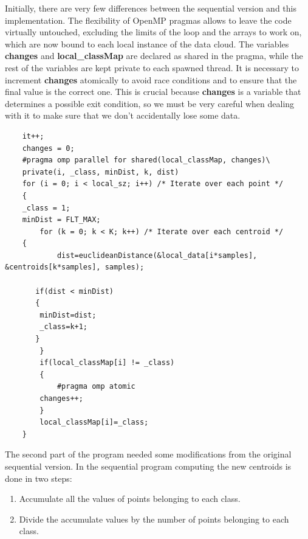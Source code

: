 \documentclass{article}
\begin{document}
Initially, there are very few differences between the sequential version and this implementation. The flexibility of OpenMP pragmas allows to leave the code virtually untouched, excluding the limits of the loop and the arrays to work on, which are now bound to each local instance of the data cloud. The variables \textbf{changes} and \textbf{local\_classMap} are declared as shared in the pragma, while the rest of the variables are kept private to each spawned thread. It is necessary to increment \textbf{changes} atomically to avoid race conditions and to ensure that the final value is the correct one. This is crucial because \textbf{changes} is a variable that determines a possible exit condition, so we must be very careful when dealing with it to make sure that we don't accidentally lose some data.
\begin{lstlisting}
    it++;
    changes = 0;
    #pragma omp parallel for shared(local_classMap, changes)\
    private(i, _class, minDist, k, dist)
    for (i = 0; i < local_sz; i++) /* Iterate over each point */
    {
	_class = 1;
	minDist = FLT_MAX;
        for (k = 0; k < K; k++) /* Iterate over each centroid */
	{
            dist=euclideanDistance(&local_data[i*samples], &centroids[k*samples], samples);

	   if(dist < minDist)
	   {
		minDist=dist;
		_class=k+1;
	   }
        }
        if(local_classMap[i] != _class)
        {
            #pragma omp atomic
	    changes++;
        }
        local_classMap[i]=_class;
    }
\end{lstlisting}
The second part of the program needed some modifications from the original sequential version. In the sequential program computing the new centroids is done in two steps:
\begin{enumerate}
    \item Accumulate all the values of points belonging to each class.
    \item Divide the accumulate values by the number of points belonging to each class.
\end{enumerate}
\end{document}
